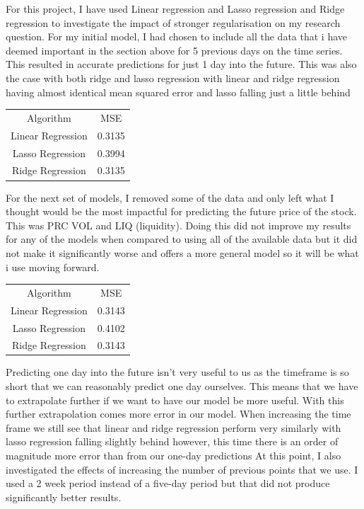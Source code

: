 \documentclass{report}
\begin{document}
For this project, I have used Linear regression and Lasso regression and Ridge regression to investigate the impact of stronger regularisation on my research question.
For my initial model, I had chosen to include all the data that i have deemed important in the section above for 5 previous days on the time series. This resulted in accurate predictions for just 1 day into the future. This was also the case with both ridge and lasso regression with linear and ridge regression having almost identical mean squared error and lasso falling just a little behind

\begin{minipage} {\linewidth}
\bigskip
\centering
{}
\begin{tabular}{c c}
    Algorithm & MSE \\
    Linear Regression & 0.3135 \\
    Lasso Regression & 0.3994 \\
    Ridge Regression & 0.3135
\end{tabular}
\bigskip
\end{minipage}

For the next set of models, I removed some of the data and only left what I thought would be the most impactful for predicting the future price of the stock.
This was PRC VOL and LIQ (liquidity).
Doing this did not improve my results for any of the models when compared to using all of the available data but it did not make it significantly worse and offers a more general model so it will be what i use moving forward.

\begin{minipage} {\linewidth}
\bigskip
\centering
{}
\begin{tabular}{c c}
    Algorithm & MSE \\
    Linear Regression & 0.3143 \\
    Lasso Regression & 0.4102 \\
    Ridge Regression & 0.3143
\end{tabular}
\bigskip
\end{minipage}

Predicting one day into the future isn't very useful to us as the timeframe is so short that we can reasonably predict one day ourselves. This means that we have to extrapolate further if we want to have our model be more useful.
With this further extrapolation comes more error in our model.
When increasing the time frame we still see that linear and ridge regression perform very similarly with lasso regression falling slightly behind however, this time there is an order of magnitude more error than from our one-day predictions
At this point, I also investigated the effects of increasing the number of previous points that we use. I used a 2 week period instead of a five-day period but that did not produce significantly better results.
\end{document}
